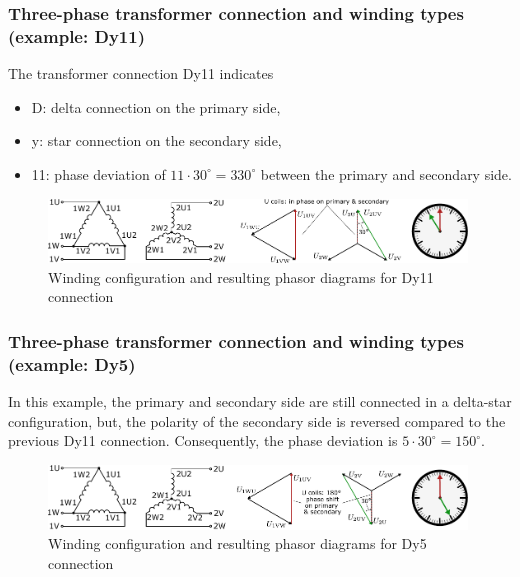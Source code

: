 \begin{frame}
	\frametitle{Three-phase transformer connection and winding types (example: Dy11)}	
	The transformer connection Dy11 indicates
	\begin{itemize}
		\item D: delta connection on the primary side,
		\item y: star connection on the secondary side,
		\item 11: phase deviation of $11\cdot30^\circ=330^\circ$ between the primary and secondary side.
	\end{itemize}
	\vspace{2em}
	\begin{figure}
		\includegraphics[width=0.99\textwidth]{fig/lec04/Dy11_example.pdf}
		\caption{Winding configuration and resulting phasor diagrams for Dy11 connection}
		\label{fig:Dy11_example}
	\end{figure}
\end{frame}

\begin{frame}
	\frametitle{Three-phase transformer connection and winding types (example: Dy5)}
	In this example, the primary and secondary side are still connected in a delta-star configuration, but, the polarity of the secondary side is reversed compared to the previous Dy11 connection. Consequently, the phase deviation is $5\cdot30^\circ=150^\circ$.
	\vspace{2em}
	\begin{figure}
		\includegraphics[width=0.99\textwidth]{fig/lec04/Dy5_example.pdf}
		\caption{Winding configuration and resulting phasor diagrams for Dy5 connection}
		\label{fig:Dy5_example}
	\end{figure}
\end{frame}


